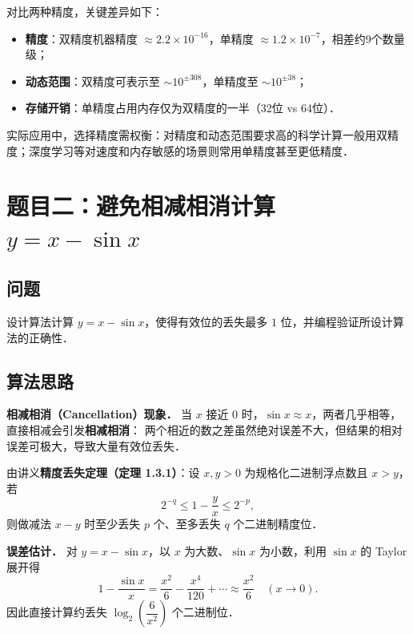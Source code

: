\documentclass[UTF8,a4paper,11pt]{article}
\begin{document}
对比两种精度，关键差异如下：
\begin{itemize}
  \item \textbf{精度}：双精度机器精度 $\approx 2.2\times10^{-16}$，单精度 $\approx 1.2\times10^{-7}$，相差约9个数量级；
  \item \textbf{动态范围}：双精度可表示至 $\sim10^{\pm308}$，单精度至 $\sim10^{\pm38}$；
  \item \textbf{存储开销}：单精度占用内存仅为双精度的一半（32位 vs 64位）．
\end{itemize}

实际应用中，选择精度需权衡：对精度和动态范围要求高的科学计算一般用双精度；深度学习等对速度和内存敏感的场景则常用单精度甚至更低精度．

\clearpage

\section{题目二：避免相减相消计算 \texorpdfstring{$y = x - \sin x$}{y = x - sin(x)}}

\subsection{问题}

设计算法计算 $y = x - \sin x$，使得有效位的丢失最多 $1$ 位，并编程验证所设计算法的正确性．

\subsection{算法思路}

\noindent\textbf{相减相消（Cancellation）现象．}
当 $x$ 接近 $0$ 时，$\sin x \approx x$，两者几乎相等，直接相减会引发\textbf{相减相消}：
两个相近的数之差虽然绝对误差不大，但结果的相对误差可极大，导致大量有效位丢失．

由讲义\textbf{精度丢失定理（定理 1.3.1）}：设 $x, y > 0$ 为规格化二进制浮点数且 $x > y$，若
$$2^{-q} \le 1 - \frac{y}{x} \le 2^{-p},$$
则做减法 $x - y$ 时至少丢失 $p$ 个、至多丢失 $q$ 个二进制精度位．

\noindent\textbf{误差估计．}
对 $y = x - \sin x$，以 $x$ 为大数、$\sin x$ 为小数，利用 $\sin x$ 的 Taylor 展开得
$$1 - \frac{\sin x}{x} = \frac{x^2}{6} - \frac{x^4}{120} + \cdots \approx \frac{x^2}{6} \quad (x \to 0).$$
因此直接计算约丢失 $\log_2\!\left(\dfrac{6}{x^2}\right)$ 个二进制位．
\end{document}
